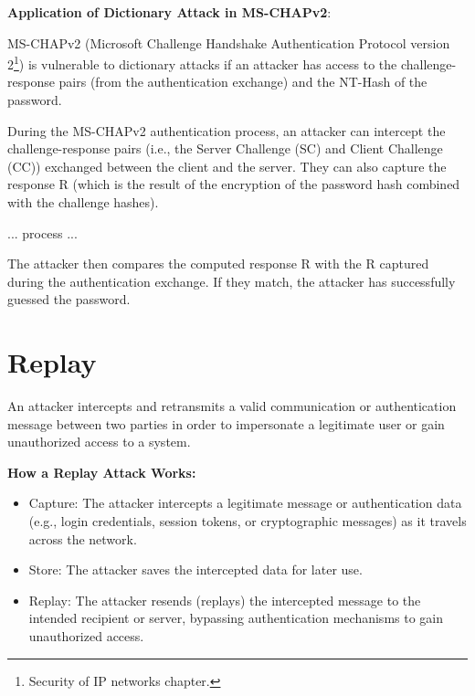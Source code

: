 \hfill

\textbf{Application of Dictionary Attack in MS-CHAPv2}:

MS-CHAPv2 (Microsoft Challenge Handshake Authentication Protocol version 2\footnote{Security of IP networks chapter.}) is vulnerable to dictionary attacks if an attacker has access to the challenge-response pairs (from the authentication exchange) and the NT-Hash of the password.

During the MS-CHAPv2 authentication process, an attacker can intercept the challenge-response pairs (i.e., the Server Challenge (SC) and Client Challenge (CC)) exchanged between the client and the server. They can also capture the response R (which is the result of the encryption of the password hash combined with the challenge hashes).

... process ... 

The attacker then compares the computed response R with the R captured during the authentication exchange. If they match, the attacker has successfully guessed the password.

\centering
\section{Replay}
\raggedright
An attacker intercepts and retransmits a valid communication or authentication message between two parties in order to impersonate a legitimate user or gain unauthorized access to a system.

\textbf{How a Replay Attack Works:}
\begin{itemize}
    \item Capture: The attacker intercepts a legitimate message or authentication data (e.g., login credentials, session tokens, or cryptographic messages) as it travels across the network.
    \item Store: The attacker saves the intercepted data for later use.
    \item Replay: The attacker resends (replays) the intercepted message to the intended recipient or server, bypassing authentication mechanisms to gain unauthorized access.
\end{itemize}

